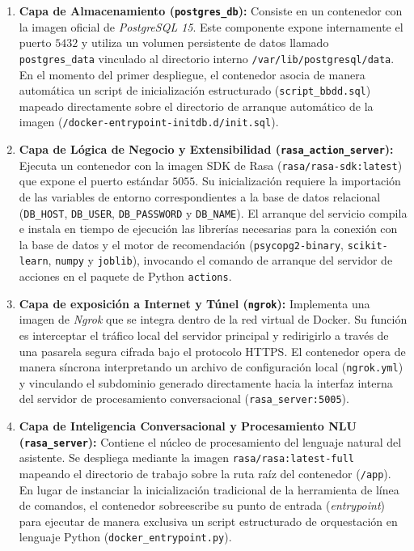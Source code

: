 \documentclass[a4paper,12pt,twoside,final]{book}
\begin{document}
\begin{enumerate}
    \item \textbf{Capa de Almacenamiento (\texttt{postgres\_db}):} Consiste en un contenedor con la imagen oficial de \textit{PostgreSQL 15}. Este componente expone internamente el puerto $5432$ y utiliza un volumen persistente de datos llamado \texttt{postgres\_data} vinculado al directorio interno \texttt{/var/lib/postgresql/data}. En el momento del primer despliegue, el contenedor asocia de manera automática un script de inicialización estructurado (\texttt{script\_bbdd.sql}) mapeado directamente sobre el directorio de arranque automático de la imagen (\texttt{/docker-entrypoint-initdb.d/init.sql}).
    
    \item \textbf{Capa de Lógica de Negocio y Extensibilidad (\texttt{rasa\_action\_server}):} Ejecuta un contenedor con la imagen SDK de Rasa (\texttt{rasa/rasa-sdk:latest}) que expone el puerto estándar $5055$. Su inicialización requiere la importación de las variables de entorno correspondientes a la base de datos relacional (\texttt{DB\_HOST}, \texttt{DB\_USER}, \texttt{DB\_PASSWORD} y \texttt{DB\_NAME}). El arranque del servicio compila e instala en tiempo de ejecución las librerías necesarias para la conexión con la base de datos y el motor de recomendación (\texttt{psycopg2-binary}, \texttt{scikit-learn}, \texttt{numpy} y \texttt{joblib}), invocando el comando de arranque del servidor de acciones en el paquete de Python \texttt{actions}.
    
    \item \textbf{Capa de exposición a Internet y Túnel (\texttt{ngrok}):} Implementa una imagen de \textit{Ngrok} que se integra dentro de la red virtual de Docker. Su función es interceptar el tráfico local del servidor principal y redirigirlo a través de una pasarela segura cifrada bajo el protocolo HTTPS. El contenedor opera de manera síncrona interpretando un archivo de configuración local (\texttt{ngrok.yml}) y vinculando el subdominio generado directamente hacia la interfaz interna del servidor de procesamiento conversacional (\texttt{rasa\_server:5005}).
    
    \item \textbf{Capa de Inteligencia Conversacional y Procesamiento NLU (\texttt{rasa\_server}):} Contiene el núcleo de procesamiento del lenguaje natural del asistente. Se despliega mediante la imagen \texttt{rasa/rasa:latest-full} mapeando el directorio de trabajo sobre la ruta raíz del contenedor (\texttt{/app}). En lugar de instanciar la inicialización tradicional de la herramienta de línea de comandos, el contenedor sobreescribe su punto de entrada (\textit{entrypoint}) para ejecutar de manera exclusiva un script estructurado de orquestación en lenguaje Python (\texttt{docker\_entrypoint.py}).
\end{enumerate}
\end{document}
